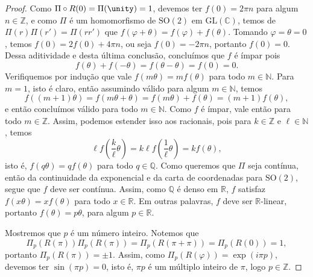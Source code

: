 \begin{proof}
    Como \(\Pi \circ R(0) = \Pi(\unity) = 1\), devemos ter \(f(0) = 2\pi n\) para algum \(n \in \mathbb{Z}\), e como \(\Pi\) é um homomorfismo de \(\mathrm{SO}(2)\) em \(\mathrm{GL}(\mathbb{C})\), temos de \(\Pi(r)\Pi(r') = \Pi(rr')\) que \(f(\varphi + \theta) = f(\varphi) + f(\theta)\). Tomando \(\varphi = \theta = 0\), temos \(f(0) = 2f(0) + 4\pi n\), ou seja \(f(0) = -2\pi n\), portanto \(f(0) = 0\). Dessa aditividade e desta última conclusão, concluímos que \(f\) é ímpar pois
    \begin{equation*}
        f(\theta) + f(-\theta) = f(\theta - \theta) = f(0) = 0.
    \end{equation*}
    Verifiquemos por indução que vale \(f(m \theta) = m f(\theta)\) para todo \(m \in \mathbb{N}\). Para \(m = 1\), isto é claro, então assumindo válido para algum \(m \in \mathbb{N}\), temos
    \begin{equation*}
        f((m+1) \theta) = f(m\theta + \theta) = f(m\theta) + f(\theta) = (m+1)f(\theta),
    \end{equation*}
    e então concluímos válido para todo \(m \in \mathbb{N}\). Como \(f\) é ímpar, vale então para todo \(m \in \mathbb{Z}\). Assim, podemos estender isso aos racionais, pois para \(k \in \mathbb{Z}\) e \(\ell \in \mathbb{N}\), temos
    \begin{equation*}
        \ell f\left(\frac{k}{\ell}\theta\right) = k\ell f\left(\frac{1}{\ell}\theta\right) = k f(\theta),
    \end{equation*}
    isto é, \(f(q\theta) = q f(\theta)\) para todo \(q \in \mathbb{Q}\). Como queremos que \(\Pi\) seja contínua, então da continuidade da exponencial e da carta de coordenadas para \(\mathrm{SO}(2)\), segue que \(f\) deve ser contínua. Assim, como \(\mathbb{Q}\) é denso em \(\mathbb{R}\), \(f\) satisfaz \(f(x \theta) = x f(\theta)\) para todo \(x \in \mathbb{R}\). Em outras palavras, \(f\) deve ser \(\mathbb{R}\)-linear, portanto \(f(\theta) = p \theta\), para algum \(p \in \mathbb{R}\).

    Mostremos que \(p\) é um número inteiro. Notemos que
    \begin{equation*}
        \Pi_p(R(\pi)) \Pi_p(R(\pi)) = \Pi_p(R(\pi + \pi)) = \Pi_p(R(0)) = 1,
    \end{equation*}
    portanto \(\Pi_p(R(\pi)) = \pm 1\). Assim, como \(\Pi_p (R(\varphi)) = \exp(i\pi p)\), devemos ter \(\sin(\pi p) = 0\), isto é, \(\pi p\) é um múltiplo inteiro de \(\pi\), logo \(p \in \mathbb{Z}\).
\end{proof}

